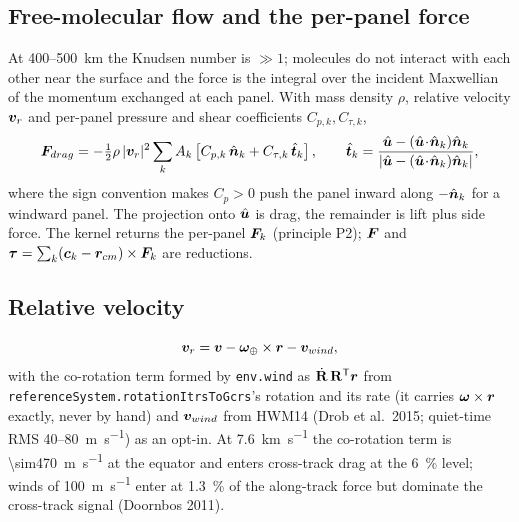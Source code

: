 \subsection{Free-molecular flow and the per-panel force}
At \SI{400}{}--\SI{500}{\kilo\metre} the Knudsen number is $\gg1$; molecules do not interact with each other near the surface and the force is the integral over the incident Maxwellian of the momentum exchanged at each panel. With mass density $\rho$, relative velocity $\bm{v}_r$ and per-panel pressure and shear coefficients $C_{p,k}, C_{\tau,k}$,
\begin{equation}
\bm{F}_{drag}=-\tfrac12\rho\,|\bm{v}_r|^2\sum_k A_k\left[C_{p,k}\,\hat{\bm{n}}_k+C_{\tau,k}\,\hat{\bm{t}}_k\right],\qquad
\hat{\bm{t}}_k=\frac{\hat{\bm{u}}-(\hat{\bm{u}}\!\cdot\!\hat{\bm{n}}_k)\hat{\bm{n}}_k}{|\hat{\bm{u}}-(\hat{\bm{u}}\!\cdot\!\hat{\bm{n}}_k)\hat{\bm{n}}_k|},
\label{eq:drag}
\end{equation}
where the sign convention makes $C_p>0$ push the panel inward along $-\hat{\bm{n}}_k$ for a windward panel. The projection onto $\hat{\bm{u}}$ is drag, the remainder is lift plus side force. The kernel returns the per-panel $\bm{F}_k$ (principle P2); $\bm{F}$ and $\bm{\tau}=\sum_k(\bm{c}_k-\bm{r}_{cm})\times\bm{F}_k$ are reductions.

\subsection{Relative velocity}
\begin{equation}
\bm{v}_r=\bm{v}-\bm{\omega}_\oplus\times\bm{r}-\bm{v}_{wind},
\end{equation}
with the co-rotation term formed by \texttt{env.wind} as $\dot{\mathbf R}\,\mathbf R^{\mathsf T}\bm{r}$ from \texttt{referenceSystem.rotationItrsToGcrs}'s rotation and its rate (it carries $\bm{\omega}\times\bm{r}$ exactly, never by hand) and $\bm{v}_{wind}$ from HWM14 (Drob et al.\ 2015; quiet-time RMS \SI{40}{}--\SI{80}{\metre\per\second}) as an opt-in. At \SI{7.6}{\kilo\metre\per\second} the co-rotation term is \SI{\sim470}{\metre\per\second} at the equator and enters cross-track drag at the \SI{6}{\percent} level; winds of \SI{100}{\metre\per\second} enter at \SI{1.3}{\percent} of the along-track force but dominate the cross-track signal (Doornbos 2011).

